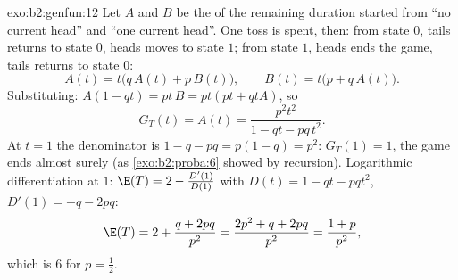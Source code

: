 \begin{solution}{exo:b2:genfun:12}
Let $A$ and $B$ be the  of the remaining
duration started from ``no current head'' and ``one current
head''. One toss is spent, then: from state $0$, tails
returns to state $0$, heads moves to state $1$; from state
$1$, heads ends the game, tails returns to state $0$:
\[
A(t) = t\bigl(q\,A(t) + p\,B(t)\bigr),
\qquad
B(t) = t\bigl(p + q\,A(t)\bigr).
\]
Substituting: $A(1 - qt) = pt\,B = pt(pt + qtA)$, so
\[
G_T(t) = A(t) = \frac{p^2t^2}{1 - qt - pq\,t^2} .
\]
At $t = 1$ the denominator is $1 - q - pq = p(1 - q) = p^2$:
$G_T(1) = 1$, the game ends almost surely (as
\cref{exo:b2:proba:6} showed by recursion). Logarithmic
differentiation at $1$: $\E(T) = 2 - \frac{D'(1)}{D(1)}$ with
$D(t) = 1 - qt - pqt^2$, $D'(1) = -q - 2pq$:
\[
\E(T) = 2 + \frac{q + 2pq}{p^2} = \frac{2p^2 + q + 2pq}{p^2}
= \frac{1 + p}{p^2},
\]
which is $6$ for $p = \frac12$.
\end{solution}

